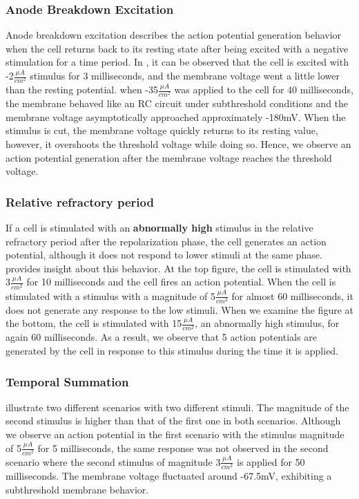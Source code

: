 \documentclass{IEEEtran}
\begin{document}
\subsubsection{Anode Breakdown Excitation}
Anode breakdown excitation describes the action potential generation behavior when the cell returns back to its resting state after being excited with a negative stimulation for a time period. In , it can be observed that the cell is excited with -2$\frac{\mu A}{cm^2}$ stimulus for 3 milliseconds, and the membrane voltage went a little lower than the resting potential. when -35$\frac{\mu A}{cm^2}$ was applied to the cell for 40 milliseconds, the membrane behaved like an RC circuit under subthreshold conditions and the membrane voltage asymptotically approached approximately -180mV. When the stimulus is cut, the membrane voltage quickly returns to its resting value, however, it overshoots the threshold voltage while doing so. Hence, we observe an action potential generation after the membrane voltage reaches the threshold voltage. 
\subsubsection{Relative refractory period}
If a cell is stimulated with an \textbf{abnormally high} stimulus in the relative refractory period after the repolarization phase, the cell generates an action potential, although it does not respond to lower stimuli at the same phase.  provides insight about this behavior. At the top figure, the cell is stimulated with 3$\frac{\mu A}{cm^2}$ for 10 milliseconds and the cell fires an action potential. When the cell is stimulated with a stimulus with a magnitude of 5$\frac{\mu A}{cm^2}$ for almost 60 milliseconds, it does not generate any response to the low stimuli. When we examine the figure at the bottom, the cell is stimulated with 15$\frac{\mu A}{cm^2}$, an abnormally high stimulus, for again 60 milliseconds. As a result, we observe that 5 action potentials are generated by the cell in response to this stimulus during the time it is applied.
\subsubsection{Temporal Summation} 
 illustrate two different scenarios with two different stimuli. The magnitude of the second stimulus is higher than that of the first one in both scenarios. Although we observe an action potential in the first scenario with the stimulus magnitude of 5$\frac{\mu A}{cm^2}$ for 5 milliseconds, the same response was not observed in the second scenario where the second stimulus of magnitude 3$\frac{\mu A}{cm^2}$ is applied for 50 milliseconds. The membrane voltage fluctuated around -67.5mV, exhibiting a subthreshold membrane behavior.
\end{document}
